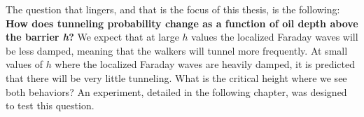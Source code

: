 The question that lingers, and that is the focus of this thesis, is the following: \textbf{How does tunneling probability change as a function of oil depth above the barrier \textbf{\textit{h}}?} We expect that at large $h$ values the localized Faraday waves will be less damped, meaning that the walkers will tunnel more frequently. At small values of $h$ where the localized Faraday waves are heavily damped, it is predicted that there will be very little tunneling. What is the critical height where we see both behaviors? An experiment, detailed in the following chapter, was designed to test this question.